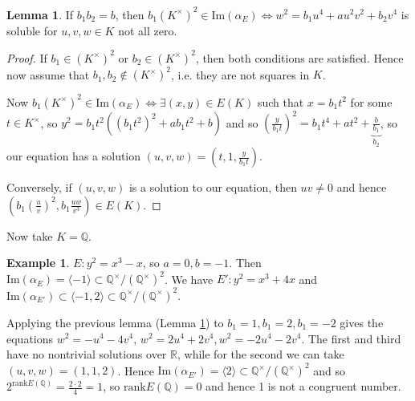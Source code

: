 \documentclass{article}
\theoremstyle{definition}
\newtheorem{lemma}[theorem]{Lemma}
\newtheorem{example}{Example}[section]
\begin{document}
\begin{lemma}\label{lemma16.5}
    If $b_1b_2=b$, then $b_1(K^\times)^2 \in \text{Im}(\alpha_E) \iff w^2 = b_1u^4+au^2v^2+b_2v^4$ is soluble for $u,v,w \in K$ not all zero.
\end{lemma}
\begin{proof}
    If $b_1 \in (K^\times)^2$ or $b_2 \in (K^\times)^2$, then both conditions are satisfied. Hence now assume that $b_1,b_2 \not\in (K^\times)^2$, i.e. they are not squares in $K$.
    \vspace{1mm}
     
    Now $b_1(K^\times)^2 \in \text{Im}(\alpha_E) \iff \exists (x,y) \in E(K)$ such that $x = b_1t^2$ for some $t \in K^\times$, so $ y^2 = b_1t^2((b_1t^2)^2+ab_1t^2+b)$ and so $\left(\frac{y}{b_1t}\right)^2 = b_1t^4 + at^2 + \underbrace{\frac{b}{b_1}}_{b_2}$, so our equation has a solution $(u,v,w) = \left(t,1,\frac{y}{b_1t}\right)$.
    \vspace{1mm}
     
    Conversely, if $(u,v,w)$ is a solution to our equation, then $uv \neq 0$ and hence $\left(b_1\left(\frac{u}{v}\right)^2, b_1 \frac{uw}{v^3}\right) \in E(K)$.
\end{proof}
Now take $K =\mathbb{Q}$.
\begin{example}
    $E: y^2=x^3-x$, so $a=0,b=-1$. Then $\text{Im}(\alpha_E) = \langle -1 \rangle \subset \mathbb{Q}^\times/(\mathbb{Q}^\times)^2$. We have $E' : y^2=x^3+4x$ and $\text{Im}(\alpha_{E'}) \subset \langle -1,2 \rangle \subset \mathbb{Q}^\times/(\mathbb{Q}^\times)^2$.
    \vspace{1mm}
     
    Applying the previous lemma (Lemma \ref{lemma16.5}) to $b_1=1, b_1 = 2, b_1=-2$ gives the equations $w^2 = -u^4 - 4 v^4$, $w^2 = 2u^4 + 2v^4, w^2  = -2u^4 - 2v^4$. The first and third have no nontrivial solutions over $\mathbb{R}$, while for the second we can take $(u,v,w)=(1,1,2)$. Hence $\text{Im}(\alpha_{E'}) = \langle 2 \rangle \subset \mathbb{Q}^\times/(\mathbb{Q}^\times)^2$ and so $2^{\text{rank}E(\mathbb{Q})}=\frac{2\cdot 2}{4}=1$, so $\text{rank}E(\mathbb{Q})=0$ and hence 1 is not a congruent number.
\end{example}
\end{document}
